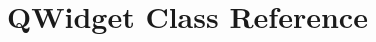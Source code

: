 \hypertarget{classGUI_1_1Player_1_1QWidget}{}\section{Q\+Widget Class Reference}
\label{classGUI_1_1Player_1_1QWidget}

